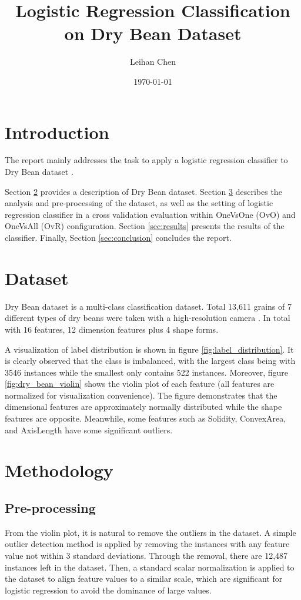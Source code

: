 \documentclass[12pt,a4paper]{article}
\title{Logistic Regression Classification on Dry Bean Dataset}
\author{Leihan Chen}
\date{\today}
\begin{document}

\section{Introduction}
The report mainly addresses the task to apply a logistic regression classifier \cite{scikit-learn_LogisticRegression} to Dry Bean dataset \cite{dry_bean_602}. 

Section \ref{sec:dataset} provides a description of Dry Bean dataset. 
Section \ref{sec:methodology} describes the analysis and pre-processing of the dataset, 
as well as the setting of logistic regression classifier in a cross validation evaluation within OneVsOne (OvO) and OneVsAll (OvR) configuration. 
Section \ref{sec:results} presents the results of the classifier. Finally, Section \ref{sec:conclusion} concludes the report. 


\section{Dataset}\label{sec:dataset}
Dry Bean dataset is a multi-class classification dataset. Total 13,611 grains of 7 different types of dry beans were taken with a high-resolution camera \cite{dry_bean_602}. In total with 16 features, 12 dimension features plus 4 shape forms. 

A visualization of label distribution is shown in figure \ref{fig:label_distribution}. It is clearly observed that the class is imbalanced, with the largest class being with 3546 instances while the smallest only contains 522 instances.
Moreover, figure \ref{fig:dry_bean_violin} shows the violin plot of each feature (all features are normalized for visualization convenience). 
The figure demonstrates that the dimensional features are approximately normally distributed while the shape features are opposite. Meanwhile, some features such as Solidity, ConvexArea, and AxisLength have some significant outliers.

\section{Methodology}\label{sec:methodology}
\subsection{Pre-processing}\label{subsec:preprocessing}
From the violin plot, it is natural to remove the outliers in the dataset. A simple outlier detection method is applied by removing the instances with any feature value not within 3 standard deviations.
Through the removal, there are 12,487 instances left in the dataset. Then, a standard scalar normalization is applied to the dataset to align feature values to a similar scale, which are significant for logistic regression to avoid the dominance of large values.
\end{document}
